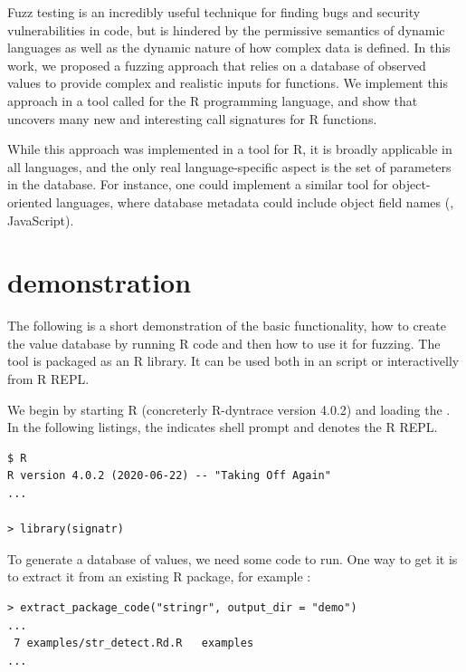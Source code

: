 \documentclass[sigplan,nonacm,anonymous,review]{acmart}
\begin{document}
Fuzz testing is an incredibly useful technique for finding bugs and security vulnerabilities in code, but is hindered by the permissive semantics of dynamic languages as well as the dynamic nature of how complex data is defined.
In this work, we proposed a fuzzing approach that relies on a database of observed values to provide complex and realistic inputs for functions.
We implement this approach in a tool called \tool for the R programming language, and show that \tool uncovers many new and interesting call signatures for R functions.

While this approach was implemented in a tool for R, it is broadly applicable in all languages, and the only real language-specific aspect is the set of parameters in the database.
For instance, one could implement a similar tool for object-oriented languages, where database metadata could include object field names (\Eg, JavaScript).




\appendix

\section{\tool demonstration}\label{sec:demo}

\lstset{
    basicstyle=\scriptsize\ttfamily,
    numbers=none,
}

The following is a short demonstration of the basic \tool functionality, \Ie how to create the value database by running R code and then how to use it for fuzzing.
The tool is packaged as an R library.
It can be used both in an script or interactivelly from R REPL.

We begin by starting R (concreterly R-dyntrace version 4.0.2) and loading the \tool.
In the following listings, the \code{$} indicates shell prompt and \code{>} denotes the R REPL.

\begin{lstlisting}
$ R
R version 4.0.2 (2020-06-22) -- "Taking Off Again"
...

> library(signatr)
\end{lstlisting}

To generate a database of values, we need some code to run.
One way to get it is to extract it from an existing R package, for example :

\begin{lstlisting}
> extract_package_code("stringr", output_dir = "demo")
...
 7 examples/str_detect.Rd.R   examples
...
\end{lstlisting}
\end{document}

